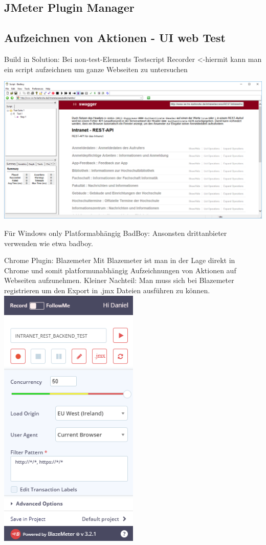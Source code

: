 \documentclass[a4paper,12pt]{article}
\begin{document}
\subsection{JMeter Plugin Manager}



\subsection{Aufzeichnen von Aktionen - UI web Test}
Build in Solution:
Bei non-test-Elements Testscript Recorder <-hiermit kann man ein script aufzeichnen um ganze Webseiten zu untersuchen

\includegraphics[width=1\textwidth]{bilder/badboy.png}\par\vspace{1cm}
Für Windows only Platformabhängig BadBoy:
Ansonsten drittanbieter verwenden wie etwa badboy.

Chrome Plugin:
Blazemeter
Mit Blazemeter ist man in der Lage direkt in Chrome und somit platformunabhängig Aufzeichnungen von Aktionen auf Webseiten aufzunehmen.
Kleiner Nachteil: Man muss sich bei Blazemeter registrieren um den Export in .jmx Dateien ausführen zu können.
\includegraphics[width=0.5\textwidth]{bilder/blazemeter.png}\par\vspace{1cm}
\end{document}
